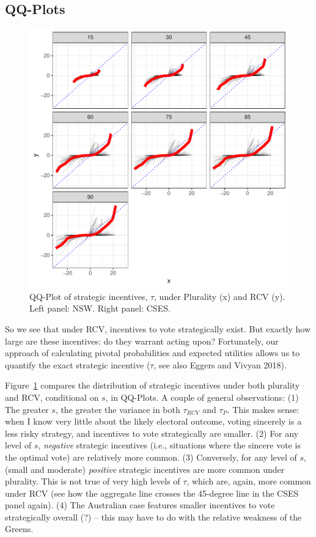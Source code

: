 \documentclass[12pt, letter, margin = 1.5 in]{article}
\begin{document}
\subsection{QQ-Plots}

\begin{figure}[!h]
	\centering
	\includegraphics[width = .6 \textwidth]{"../output/figures/cses_qq"}
	\caption{QQ-Plot of strategic incentives, $\tau$, under Plurality (x) and RCV (y). Left panel: NSW. Right panel: CSES.}
	\label{fig:qqplots}
\end{figure}

So we see that under RCV, incentives to vote strategically exist. But exactly how large are these incentives: do they warrant acting upon? Fortunately, our approach of calculating pivotal probabilities and expected utilities allows us to quantify the exact strategic incentive ($\tau$, see also Eggers and Vivyan 2018). 

Figure~\ref{fig:qqplots} compares the distribution of strategic incentives under both plurality and RCV, conditional on $s$, in QQ-Plots. A couple of general observations: (1) The greater $s$, the greater the variance in both $\tau_{RCV}$ and  $\tau_{P}$. This makes sense: when I know very little about the likely electoral outcome, voting sincerely is a less risky strategy, and incentives to vote strategically are smaller. (2) For any level of $s$, \textit{negative} strategic incentives (i.e., situations where the sincere vote is the optimal vote) are relatively more common. (3) Conversely, for any level of $s$, (small and moderate) \textit{positive} strategic incentives are more common under plurality. This is not true of very high levels of $\tau$, which are, again, more common under RCV (see how the aggregate line crosses the 45-degree line in the CSES panel again). (4) The Australian case features smaller incentives to vote strategically overall (?) -- this may have to do with the relative weakness of the Greens. 
\end{document}
